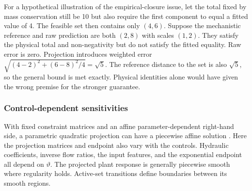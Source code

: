 For a hypothetical illustration of the empirical-closure issue, let the total fixed by mass conservation still be 10 but also require the first component to equal a fitted value of 4. The feasible set then contains only $(4,6)$. Suppose the mechanistic reference and raw prediction are both $(2,8)$ with scales $(1,2)$. They satisfy the physical total and non-negativity but do not satisfy the fitted equality. Raw error is zero. Projection introduces weighted error $\sqrt{(4-2)^2+(6-8)^2/4}=\sqrt5$. The reference distance to the set is also $\sqrt5$, so the general bound is met exactly. Physical identities alone would have given the wrong premise for the stronger guarantee.

\subsubsection{Control-dependent sensitivities}

With fixed constraint matrices and an affine parameter-dependent right-hand side, a parametric quadratic projection can have a piecewise affine solution \citep{Tondel2003}. Here the projection matrices and endpoint also vary with the controls. Hydraulic coefficients, inverse flow ratios, the input features, and the exponential endpoint all depend on $\vartheta$. The projected plant response is generally piecewise smooth where regularity holds. Active-set transitions define boundaries between its smooth regions.

